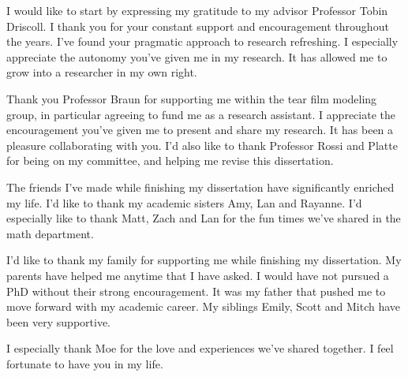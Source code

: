 I would like to start by expressing my gratitude to my advisor Professor Tobin Driscoll. I thank you for your constant support and encouragement throughout the years. I've found your pragmatic approach to research refreshing. I especially appreciate the autonomy you've given me in my research. It has allowed me to grow into a researcher in my own right.

Thank you Professor Braun for supporting me within the tear film modeling group, in particular agreeing to fund me as a research assistant. I appreciate the encouragement you've given me to present and share my research. It has been a pleasure collaborating with you. I'd also like to thank Professor Rossi and Platte for being on my committee, and helping me revise this dissertation.

The friends I've made while finishing my dissertation have significantly enriched my life. I'd like to thank my academic sisters Amy, Lan and Rayanne. I'd especially like to thank Matt, Zach and Lan for the fun times we've shared in the math department.

I'd like to thank my family for supporting me while finishing my dissertation. My parents have helped me anytime that I have asked. I would have not pursued a PhD without their strong encouragement. It was my father that pushed me to move forward with my academic career. My siblings Emily, Scott and Mitch have been very supportive.

I especially thank Moe for the love and experiences we've shared together. I feel fortunate to have you in my life.
